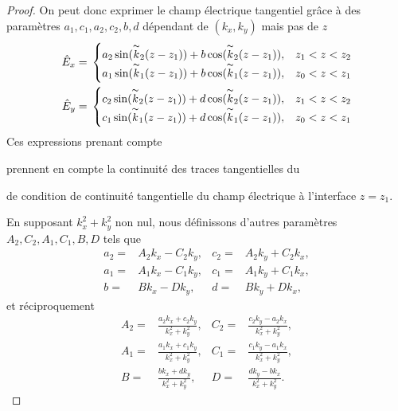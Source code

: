 \begin{proof}
    On peut donc exprimer le champ électrique tangentiel grâce à des paramètres \(a_1,c_1,a_2,c_2,b,d\) dépendant de \((k_x,k_y)\) mais pas de \(z\)
    \begin{align*}
    \hat{E}_x={}& 
    \begin{cases}
    a_2\sin(\overset{\thicksim}{k}_2(z-z_1))+b\cos(\overset{\thicksim}{k}_2(z-z_1)),&  z_1<z<z_2
    \\
    a_1\sin(\overset{\thicksim}{k}_1(z-z_1))+b\cos(\overset{\thicksim}{k}_1(z-z_1)),&  z_0<z<z_1
    \end{cases}
    \\
    \hat{E}_y={}&
    \begin{cases}
    c_2\sin(\overset{\thicksim}{k}_2(z-z_1))+d\cos(\overset{\thicksim}{k}_2(z-z_1)),&   z_1<z<z_2
    \\
    c_1\sin(\overset{\thicksim}{k}_1(z-z_1))+d\cos(\overset{\thicksim}{k}_1(z-z_1)),&   z_0<z<z_1
    \end{cases}
    \end{align*}
    Ces expressions prenant compte
    \begin{REM}
  prennent en compte la continuité des traces tangentielles du
\end{REM} de condition de continuité tangentielle du champ électrique à l'interface \(z=z_1\).

    En supposant \(k_x^2 + k_y^2\) non nul, nous définissons d'autres paramètres \(A_2,C_2, A_1, C_1, B, D\) tels que
    \begin{align*}
    a_2 ={}& A_2k_x - C_2k_y, & c_2 ={}& A_2k_y + C_2 k_x,
    \\
    a_1 ={}& A_1k_x - C_1k_y, & c_1 ={}& A_1k_y + C_1 k_x,
    \\
    b ={}& Bk_x - Dk_y, & d ={}& Bk_y + D k_x,
    \end{align*}
    et réciproquement
    \begin{align*}
    A_2 ={}& \frac{a_2 k_x + c_2 k_y}{k_x^2 + k_y^2}, & C_2 ={}& \frac{c_2 k_y - a_2 k_x}{k_x^2 + k_y^2},
    \\
    A_1 ={}& \frac{a_1 k_x + c_1 k_y}{k_x^2 + k_y^2}, & C_1 ={}& \frac{c_1 k_y - a_1 k_x}{k_x^2 + k_y^2},
    \\
    B ={}& \frac{b k_x + d k_y}{k_x^2 + k_y^2}, & D ={}& \frac{d k_y - b k_x}{k_x^2 + k_y^2}.
    \end{align*}


\end{proof}
